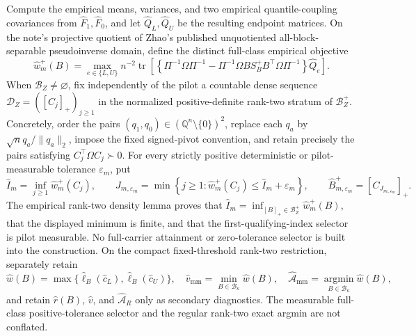 Compute the empirical means, variances, and two empirical quantile-coupling covariances from \(\widehat F_1,\widehat F_0\), and let \(\widehat Q_L,\widehat Q_U\) be the resulting endpoint matrices.  On the note's projective quotient of Zhao's published unquotiented all-block-separable pseudoinverse domain, define the distinct full-class empirical objective
\[
\widehat w_m^+(B)=
\max_{e\in\{L,U\}}n^{-2}\operatorname{tr}\!\left[
\left\{\Pi^{-1}\Omega\Pi^{-1}
-\Pi^{-1}\Omega B S_B^+B^{\top}\Omega\Pi^{-1}\right\}\widehat Q_e
\right].
\]
When \(\mathcal B_Z\ne\varnothing\), fix independently of the pilot a countable dense sequence \(\mathcal D_Z=([C_j]_+)_{j\ge1}\) in the normalized positive-definite rank-two stratum of \(\mathcal B_Z^+\).  Concretely, order the pairs \((q_1,q_0)\in(\mathbb Q^n\setminus\{0\})^2\), replace each \(q_a\) by \(\sqrt n q_a/\lVert q_a\rVert_2\), impose the fixed signed-pivot convention, and retain precisely the pairs satisfying \(C_j^{\top}\Omega C_j\succ0\).  For every strictly positive deterministic or pilot-measurable tolerance \(\varepsilon_m\), put
\[
\widehat I_m=\inf_{j\ge1}\widehat w_m^+(C_j),
\qquad
J_{m,\varepsilon_m}
=\min\left\{j\ge1:
\widehat w_m^+(C_j)\le\widehat I_m+\varepsilon_m\right\},
\qquad
\widehat B_{m,\varepsilon_m}^+=[C_{J_{m,\varepsilon_m}}]_+.
\]
The empirical rank-two density lemma proves that \(\widehat I_m=\inf_{[B]_+\in\mathcal B_Z^+}\widehat w_m^+(B)\), that the displayed minimum is finite, and that the first-qualifying-index selector is pilot measurable.  No full-carrier attainment or zero-tolerance selector is built into the construction.  On the compact fixed-threshold rank-two restriction, separately retain
\[
\widehat w(B)=\max\{\widehat\ell_B(\widehat c_L),\widehat\ell_B(\widehat c_U)\},
\quad
\widehat v_{\mathrm{mm}}=\min_{B\in\mathcal B_\kappa}\widehat w(B),
\quad
\widehat{\mathcal A}_{\mathrm{mm}}=\operatorname*{argmin}_{B\in\mathcal B_\kappa}\widehat w(B),
\]
and retain \(\widehat r(B)\), \(\widehat v\), and \(\widehat{\mathcal A}_R\) only as secondary diagnostics.  The measurable full-class positive-tolerance selector and the regular rank-two exact argmin are not conflated.